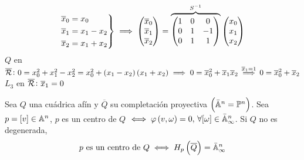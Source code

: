 \begin{example}
\begin{enumerate}
\begin{gather*}
\begin{rcases}
                    \overline{x}_0 = x_0 \\
                    \overline{x}_1 = x_1 - x_2 \\
                    \overline{x}_2 = x_1 + x_2
                \end{rcases}
                \implies
                \begin{pmatrix}
                    \overline{x}_0 \\
                    \overline{x}_1 \\
                    \overline{x}_2
                \end{pmatrix} =
                \overbrace{ \begin{pmatrix}
                    1 & 0 & 0 \\
                    0 & 1 & -1 \\
                    0 & 1 & 1
                \end{pmatrix}}^{S^{-1}}
                \begin{pmatrix}
                    x_0 \\ x_1 \\ x_2
                \end{pmatrix}
            \end{gather*}
            $Q$ en $\overline{\mathcal{R}} \colon 0 = x_0^2 + x_1^2 - x_2^2 = x_0^2 + \left( x_1 - x_2 \right) \left( x_1 + x_2 \right) \implies 0 = \overline{x}_0^2 + \overline{x}_1\overline{x}_2 \stackrel{\overline{x}_1 = 1}{\implies} 0 = \overline{x}_0^2 + \overline{x}_2$ \\
            $L_3$ en $\overline{\mathcal{R}} \colon \overline{x}_1 = 0$
    \end{enumerate}
\end{example}
\begin{defi}
    Sea $Q$ una cuádrica afín y $\overline{Q}$ su completación proyectiva $\left( \bar{\mathbb{A}}^n = \mathbb{P}^n \right)$. Sea $p=[v]\in\mathbb{A}^n$, $p$ es un centro de $Q$ $\iff \varphi\left( v, \omega \right) = 0, \, \forall [\omega] \in\bar{\mathbb{A}}^n_\infty$. Si $Q$ no es degenerada,
    \[ p \text{ es un centro de }Q \iff H_p\left( \overline{Q} \right) = \bar{\mathbb{A}}^n_\infty \]
\end{defi}
